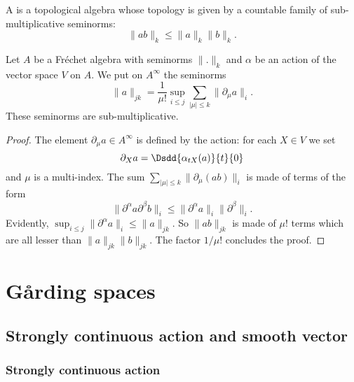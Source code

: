 \begin{definition}
	A  is a topological algebra whose topology is given by a countable family of sub-multiplicative seminorms:
	\[
		\| ab \|_k\leq \| a \|_k\| b \|_k.
	\]

\end{definition}

\begin{proposition}
	Let $A$ be a Fréchet algebra with seminorms $\| . \|_k$ and $\alpha$ be an action of the vector space $V$ on $A$. We put on $A^{\infty}$ the seminorms
	\begin{equation}
		\| a \|_{jk}=\frac{1}{ \mu! }\sup_{i\leq j}\sum_{| \mu |\leq k}\| \partial_{\mu}a \|_i.
	\end{equation}
	These seminorms are sub-multiplicative.

\end{proposition}

\begin{proof}
	The element $\partial_{\mu}a\in A^{\infty}$ is defined by the action: for each $X\in V$ we set
	\[
		\partial_X a=\Dsdd{ \alpha_{tX}(a) }{t}{0}
	\]
	and $\mu$ is a multi-index. The sum $\sum_{| \mu |\leq k}\| \partial_{\mu}(ab) \|_{i}$ is made of terms of the form
	\[
		\| \partial^{\alpha}a\partial^{\beta}b \|_i\leq\| \partial^{\alpha}a \|_i\| \partial^{\beta} \|_i.
	\]
	Evidently, $\sup_{i\leq j}\| \partial^{\alpha}a \|_i\leq \| a \|_{jk}$. So $\| ab \|_{jk}$ is made of $\mu !$ terms which are all lesser than $\| a \|_{jk}\| b \|_{jk}$. The factor $1/\mu!$ concludes the proof.

\end{proof}
%
\section{G\r arding spaces}
%

\subsection{Strongly continuous action and smooth vector}  \label{subsec:actionrn}

\subsubsection{Strongly continuous action}

